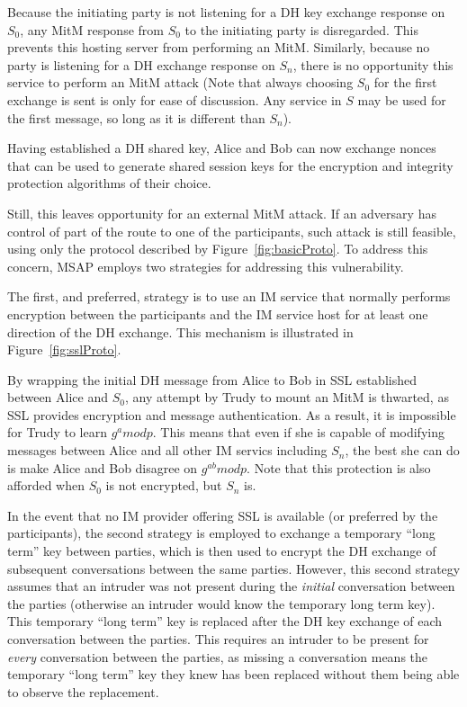 \documentclass[twoside,10pt]{article}
\begin{document}
\begin{multicols}{2}
Because the initiating party is not listening for a DH key exchange response on $S_0$, any MitM response from $S_0$ to the initiating party is disregarded.  This prevents this hosting server from performing an MitM.  Similarly, because no party is listening for a DH exchange response on $S_n$, there is no opportunity this service to perform an MitM attack (Note that always choosing $S_0$ for the first exchange is sent is only for ease of discussion.  Any service in $S$ may be used for the first message, so long as it is different than $S_n$).

Having established a DH shared key, Alice and Bob can now exchange nonces that can be used to generate shared session keys for the encryption and integrity protection algorithms of their choice.

Still, this leaves opportunity for an external MitM attack.  If an adversary has control of part of the route to one of the participants, such attack is still feasible, using only the protocol described by Figure~\ref{fig:basicProto}.  To address this concern, MSAP employs two strategies for addressing this vulnerability.

The first, and preferred, strategy is to use an IM service that normally performs encryption between the participants and the IM service host for at least one direction of the DH exchange.  This mechanism is illustrated in Figure~\ref{fig:sslProto}.

By wrapping the initial DH message from Alice to Bob in SSL established between Alice and $S_0$, any attempt by Trudy to mount an MitM is thwarted, as SSL provides encryption and message authentication.  As a result, it is impossible for Trudy to learn $g^a mod p$.  This means that even if she is capable of modifying messages between Alice and all other IM servics including $S_n$, the best she can do is make Alice and Bob disagree on $g^{ab} mod p$.  Note that this protection is also afforded when $S_0$ is not encrypted, but $S_n$ is.

In the event that no IM provider offering SSL is available (or preferred by the participants), the second strategy is employed to exchange a temporary ``long term'' key between parties, which is then used to encrypt the DH exchange of subsequent conversations between the same parties.  However, this second strategy assumes that an intruder was not present during the \emph{initial} conversation between the parties (otherwise an intruder would know the temporary long term key).  This temporary ``long term'' key is replaced after the DH key exchange of each conversation between the parties.  This requires an intruder to be  present for \emph{every} conversation between the parties, as missing a conversation means the temporary ``long term'' key they knew has been replaced without them being able to observe the replacement.


\end{multicols}
\end{document}
